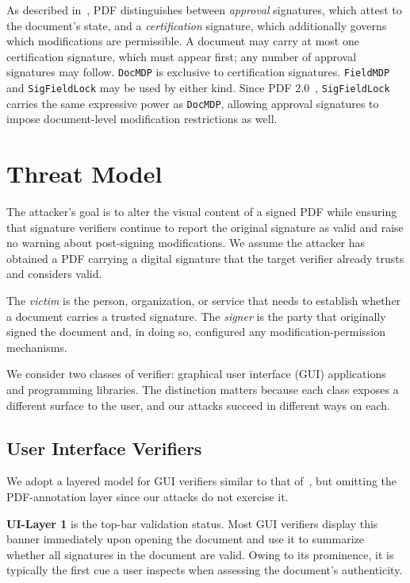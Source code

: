 \documentclass[12pt]{article}
\begin{document}
As described in~\cite{pdf-certification-attack}, PDF distinguishes between \emph{approval} signatures, which attest to the document's state, and a \emph{certification} signature, which additionally governs which modifications are permissible. A document may carry at most one certification signature, which must appear first; any number of approval signatures may follow. \texttt{DocMDP} is exclusive to certification signatures. \texttt{FieldMDP} and \texttt{SigFieldLock} may be used by either kind. Since PDF 2.0~\cite{iso32000-2}, \texttt{SigFieldLock} carries the same expressive power as \texttt{DocMDP}, allowing approval signatures to impose document-level modification restrictions as well.


\section{Threat Model}

The attacker's goal is to alter the visual content of a signed PDF while ensuring that signature verifiers continue to report the original signature as valid and raise no warning about post-signing modifications. We assume the attacker has obtained a PDF carrying a digital signature that the target verifier already trusts and considers valid.

The \emph{victim} is the person, organization, or service that needs to establish whether a document carries a trusted signature. The \emph{signer} is the party that originally signed the document and, in doing so, configured any modification-permission mechanisms.

We consider two classes of verifier: graphical user interface (GUI) applications and programming libraries. The distinction matters because each class exposes a different surface to the user, and our attacks succeed in different ways on each.

\subsection{User Interface Verifiers}

We adopt a layered model for GUI verifiers similar to that of~\cite{pdf-certification-attack}, but omitting the PDF-annotation layer since our attacks do not exercise it.

\textbf{UI-Layer 1} is the top-bar validation status. Most GUI verifiers display this banner immediately upon opening the document and use it to summarize whether all signatures in the document are valid. Owing to its prominence, it is typically the first cue a user inspects when assessing the document's authenticity.
\end{document}
